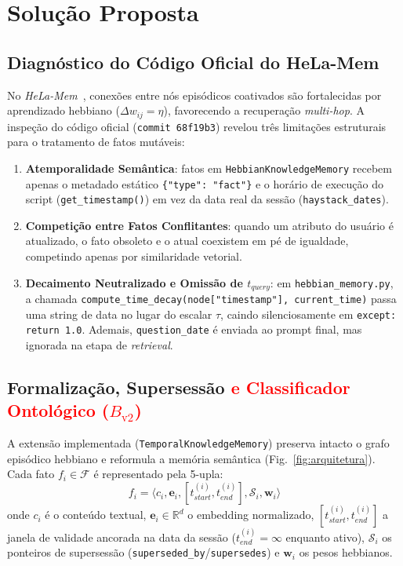 \documentclass[10pt,conference,twocolumn]{IEEEtran}
\newcommand{\novo}[1]{\textcolor{red}{#1}}
\begin{document}
\section{Solução Proposta}

\subsection{Diagnóstico do Código Oficial do HeLa-Mem}
No \textit{HeLa-Mem}~\cite{helamem2026}, conexões entre nós episódicos coativados são fortalecidas por aprendizado hebbiano ($\Delta w_{ij} = \eta$), favorecendo a recuperação \textit{multi-hop}. A inspeção do código oficial (\texttt{commit 68f19b3}) revelou três limitações estruturais para o tratamento de fatos mutáveis:
\begin{enumerate}
    \item \textbf{Atemporalidade Semântica}: fatos em \texttt{HebbianKnowledgeMemory} recebem apenas o metadado estático \texttt{\{"type": "fact"\}} e o horário de execução do script (\texttt{get\_timestamp()}) em vez da data real da sessão (\texttt{haystack\_dates}).
    \item \textbf{Competição entre Fatos Conflitantes}: quando um atributo do usuário é atualizado, o fato obsoleto e o atual coexistem em pé de igualdade, competindo apenas por similaridade vetorial.
    \item \textbf{Decaimento Neutralizado e Omissão de $t_{query}$}: em \texttt{hebbian\_memory.py}, a chamada \texttt{compute\_time\_decay(node["timestamp"], current\_time)} passa uma string de data no lugar do escalar $\tau$, caindo silenciosamente em \texttt{except: return 1.0}. Ademais, \texttt{question\_date} é enviada ao prompt final, mas ignorada na etapa de \textit{retrieval}.
\end{enumerate}

\subsection{Formalização, Supersessão \texorpdfstring{\novo{e Classificador Ontológico ($B_{\text{v2}}$)}}{e Classificador Ontológico (B\_v2)}}
A extensão implementada (\texttt{TemporalKnowledgeMemory}) preserva intacto o grafo episódico hebbiano e reformula a memória semântica (Fig.~\ref{fig:arquitetura}). Cada fato $f_i \in \mathcal{F}$ é representado pela 5-upla:
\begin{equation}
f_i = \langle c_i, \mathbf{e}_i, [t_{start}^{(i)}, t_{end}^{(i)}], \mathcal{S}_i, \mathbf{w}_i \rangle
\end{equation}
onde $c_i$ é o conteúdo textual, $\mathbf{e}_i \in \mathbb{R}^d$ o embedding normalizado, $[t_{start}^{(i)}, t_{end}^{(i)}]$ a janela de validade ancorada na data da sessão ($t_{end}^{(i)} = \infty$ enquanto ativo), $\mathcal{S}_i$ os ponteiros de supersessão (\texttt{superseded\_by}/\texttt{supersedes}) e $\mathbf{w}_i$ os pesos hebbianos.
\end{document}
